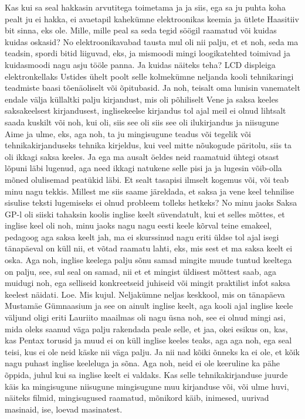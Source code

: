 Kas kui sa seal hakkasin arvutitega toimetama ja ja siis, ega sa ju puhta koha pealt ju ei hakka, ei avaetapil kahekümne elektroonikas keemia ja ütlete Haasitiiv bit sinna, eks ole. Mille, mille peal sa seda tegid söögil raamatud või kuidas kuidas oskasid?
No elektroonikavabad tausta mul oli nii palju, et et noh, seda ma teadsin, spordi bitid liiguvad, eks, ja mismoodi mingi loogikatehted toimivad ja kuidasmoodi nagu asju tööle panna. Ja kuidas näiteks teha?
LCD displeiga elektronkellaks Ustides ühelt poolt selle kolmekümne neljanda kooli tehnikaringi teadmiste baasi tõenäoliselt või õpitubasid. Ja noh, teisalt oma lunisin vanematelt endale välja küllaltki palju kirjandust, mis oli põhiliselt Vene ja saksa keeles saksakeelsest kirjandusest, inglisekeelse kirjandus tol ajal meil ei olnud lihtsalt saada kuskilt või noh, kui oli, siis see oli siis see oli ilukirjandus ja niisugune Aime ja ulme, eks, aga noh, ta ju mingisugune teadus või tegelik või tehnikakirjanduseks tehnika kirjeldus, kui veel mitte nõukogude päritolu, siis ta oli ikkagi saksa keeles. Ja ega ma ausalt öeldes neid raamatuid ühtegi otsast lõpuni läbi lugenud, aga need ikkagi natukene selle pisi ja ja lugesin võib-olla mõned olulisemad peatükid läbi. Et sealt tasapisi ilmselt kogemus või, või teab minu nagu tekkis.
Millest me siis saame järeldada, et saksa ja vene keel tehnilise sisulise teksti lugemiseks ei olnud probleem tolleks hetkeks?
No minu jaoks Saksa GP-l oli siiski tahaksin koolis inglise keelt süvendatult, kui et selles mõttes, et inglise keel oli noh, minu jaoks nagu nagu eesti keele kõrval teine emakeel, pedagoog aga saksa keelt jah, ma ei skurssinud nagu eriti üldse tol ajal isegi tänapäeval on küll nii, et võtad raamatu lahti, eks, mis sest et ma saksa keelt ei oska. Aga noh, inglise keelega palju sõnu samad mingite muude tuntud keeltega on palju, see, sul seal on samad, nii et et mingist üldisest mõttest saab, aga muidugi noh, ega selliseid konkreetseid juhiseid või mingit praktilist infot saksa keelest näidati. Loe. Mis kujul. Neljakümne neljas keskkool, mis on tänapäeva Mustamäe Gümnaasium ja see on ainult inglise keelt, aga kooli ajal inglise keele väljund oligi eriti Lauriito maailmas oli nagu üsna noh, see ei olnud mingi asi, mida oleks saanud väga palju rakendada peale selle, et jaa, okei esikus on, kas, kas Pentax torusid ja muud ei on küll inglise keeles teaks, aga aga noh, ega seal teisi, kus ei ole neid käske nii väga palju.
Ja nii nad kõiki õnneks ka ei ole, et kõik nagu puhast inglise keeleluga ja sõna. Aga noh, neid ei ole keeruline ka pähe õppida, juhul kui sa inglise keelt ei valdaks. Kas selle tehnikakirjanduse juurde käis ka mingisugune niisugune mingisugune muu kirjanduse või, või ulme huvi, näiteks filmid, mingisugused raamatud, mõnikord käib, inimesed, uurivad masinaid, ise, loevad masinatest.

